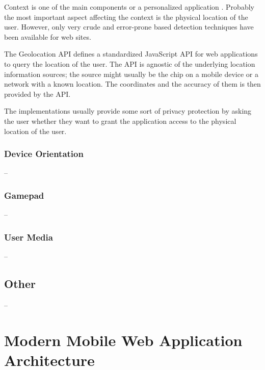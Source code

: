 Context is one of the main components or a personalized application
\cite{fling2009mobile}. Probably the most important aspect affecting
the context is the physical location of the user. However, only very
crude and error-prone  based detection techniques have been
available for web sites.

The Geolocation API defines a standardized JavaScript API for web
applications to query the location of the user. The API is agnostic of
the underlying location information sources; the source might usually
be the  chip on a mobile device or a  network
with a known location. The coordinates and the accuracy of them is
then provided by the API. \cite{geolocationAPI}

The implementations usually provide some sort of privacy protection by
asking the user whether they want to grant the application access to
the physical location of the user.

\subsubsection{Device Orientation}

--

\subsubsection{Gamepad}

--

\subsubsection{User Media}

--

\subsection{Other}

--

\section{Modern Mobile Web Application Architecture}
\label{section:modern-mobile-web}

